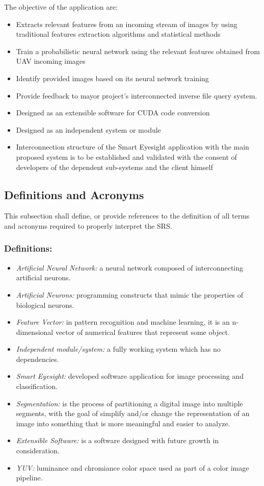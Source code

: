 \documentclass[12pt]{article}
\begin{document}
The objective of the application are:
\begin{itemize}
\item Extracts relevant features from an incoming stream of images by
  using traditional features extraction algorithms and statistical
  methods
\item Train a probabilistic neural network using the relevant features
  obtained from UAV incoming images
\item Identify provided images based on its neural network training
\item Provide feedback to mayor project's interconnected inverse file
  query system.
\item Designed as an extensible software for CUDA code conversion
\item Designed as an independent system or module
\item Interconnection structure of the Smart Eyesight application with
  the main proposed system is to be established and validated with the
  consent of developers of the dependent sub-systems and the client
  himself
\end{itemize}
\cite{ImgPC}\cite{PNNSMCRFRBIR}\cite{AGMUSIUMA}\cite{RBIRSUEFD}\cite{springerlink:10.1007/s100440170015}

\subsection{Definitions and Acronyms}
This subsection shall define, or provide references to the definition
of all terms and acronyms required to properly interpret the SRS.

\subsubsection{Definitions:}
\begin{itemize}
\item \textit{Artificial Neural Network:} a neural network composed of
  interconnecting artificial neurons.
\item \textit{Artificial Neurons:} programming constructs that mimic
  the properties of biological neurons.
\item \textit{Feature Vector:} in pattern recognition and machine
  learning, it is an n-dimensional vector of numerical features that
  represent some object.
\item \textit{Independent module/system:} a fully working system which
  has no dependencies.
\item \textit{Smart Eyesight:} developed software application for
  image processing and classification.
\item \textit{Segmentation:} is the process of partitioning a digital
  image into multiple segments, with the goal of simplify and/or
  change the representation of an image into something that is more
  meaningful and easier to analyze.
\item \textit{Extensible Software:} is a software designed with future
  growth in consideration.
\item \textit{YUV:} luminance and chromiance color space used as part
  of a color image pipeline.
\end{itemize}
\end{document}
